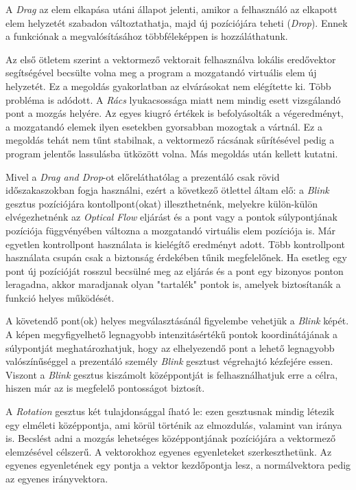 
A \textit{Drag} az elem elkapása utáni állapot jelenti, amikor a felhasználó az elkapott elem helyzetét szabadon változtathatja, majd új pozíciójára teheti (\textit{Drop}). Ennek a funkciónak a megvalósításához többféleképpen is hozzáláthatunk.

Az első ötletem szerint a vektormező vektorait felhasználva lokális eredővektor segítségével becsülte volna meg a program a mozgatandó virtuális elem új helyzetét. Ez a megoldás gyakorlatban az elvárásokat nem elégítette ki. Több probléma is adódott. A \textit{Rács} lyukacsossága miatt nem mindig esett vizsgálandó pont a mozgás helyére. Az egyes kiugró értékek is befolyásolták a végeredményt, a mozgatandó elemek ilyen esetekben gyorsabban mozogtak a vártnál. Ez a megoldás tehát nem tűnt stabilnak, a vektormező rácsának sűrítésével pedig a program jelentős lassulásba ütközött volna. Más megoldás után kellett kutatni.

Mivel a \textit{Drag and Drop}-ot előreláthatólag a prezentáló csak rövid időszakaszokban fogja használni, ezért a következő ötlettel áltam elő: a \textit{Blink} gesztus pozíciójára kontollpont(okat) illeszthetnénk, melyekre külön-külön elvégezhetnénk az \textit{Optical Flow} eljárást és a pont vagy a pontok súlypontjának pozíciója függvényében változna a mozgatandó virtuális elem pozíciója is. Már egyetlen kontrollpont használata is kielégítő eredményt adott. Több kontrollpont használata csupán csak a biztonság érdekében tűnik megfelelőnek. Ha esetleg egy pont új pozícióját rosszul becsülné meg az eljárás és a pont egy bizonyos ponton leragadna, akkor maradjanak olyan "tartalék" pontok is, amelyek biztosítanák a funkció helyes működését.

A követendő pont(ok) helyes megválasztásánál figyelembe vehetjük a \textit{Blink} képét. A képen megyfigyelhető legnagyobb intenzitásértékű pontok koordinátájának a súlypontját meghatározhatjuk, hogy az elhelyezendő pont a lehető legnagyobb valószínűséggel a prezentáló személy \textit{Blink} gesztust végrehajtó kézfejére essen. Viszont a \textit{Blink} gesztus kiszámolt középpontját is felhasználhatjuk erre a célra, hiszen már az is megfelelő pontosságot biztosít.


A \textit{Rotation} gesztus két tulajdonsággal íható le: ezen gesztusnak mindig létezik egy elméleti középpontja, ami körül történik az elmozdulás, valamint van iránya is.
Becslést adni a mozgás lehetséges középpontjának pozíciójára a vektormező elemzésével célszerű.
A vektorokhoz egyenes egyenleteket szerkeszthetünk. Az egyenes egyenletének egy pontja a vektor kezdőpontja lesz, a normálvektora pedig az egyenes irányvektora.

